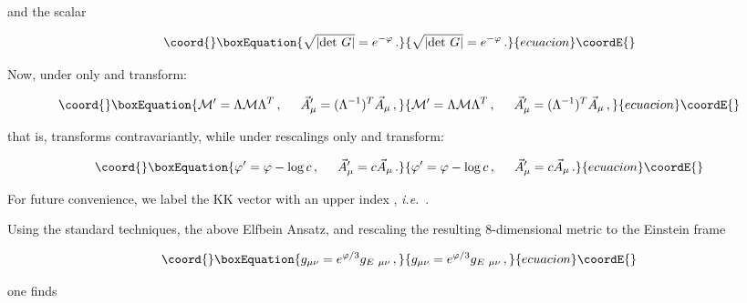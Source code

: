 \documentclass[12pt,a4paper]{article}
\begin{document}
\noindent and the scalar

\begin{equation}\coord{}\boxEquation{
\sqrt{|{\rm det}\ G|}=e^{-\varphi}\, .
}{
\sqrt{|{\rm det}\ G|}=e^{-\varphi}\, .
}{ecuacion}\coordE{}\end{equation}

\noindent Now, under \coordHE{} only \coordHE{} and \coordHE{}
transform:

\begin{equation}\coord{}\boxEquation{
{\cal M}^{\prime} = \Lambda {\cal M} \Lambda^{T}\, ,  
\hspace{.5cm}
\vec{A}_{\mu}^{\prime} = (\Lambda^{-1})^{T}\vec{A}_{\mu}\, ,
}{
{\cal M}^{\prime} = \Lambda {\cal M} \Lambda^{T}\, ,  
\hspace{.5cm}
\vec{A}_{\mu}^{\prime} = (\Lambda^{-1})^{T}\vec{A}_{\mu}\, ,
}{ecuacion}\coordE{}\end{equation}

\noindent that is, \coordHE{} transforms contravariantly,
while under \coordHE{} rescalings only \myHighlight{$\varphi$}\coordHE{} and
\coordHE{} transform:

\begin{equation}\coord{}\boxEquation{
\varphi^{\prime} = \varphi -\log{c}\, ,
\hspace{.5cm}
\vec{A}_{\mu}^{\prime} = c \vec{A}_{\mu}\, .
}{
\varphi^{\prime} = \varphi -\log{c}\, ,
\hspace{.5cm}
\vec{A}_{\mu}^{\prime} = c \vec{A}_{\mu}\, .
}{ecuacion}\coordE{}\end{equation}

\noindent For future convenience, we label the KK vector with an upper 
index \coordHE{}, {\em i.e.}~\coordHE{}.

Using the standard techniques, the above Elfbein Ansatz, and rescaling
the resulting 8-dimensional metric to the Einstein frame

\begin{equation}\coord{}\boxEquation{
\label{eq:masscale}
g_{\mu\nu} =e^{\varphi/3}g_{E\ \mu\nu}\, ,  
}{
g_{\mu\nu} =e^{\varphi/3}g_{E\ \mu\nu}\, ,  
}{ecuacion}\coordE{}\end{equation}

\noindent one finds
\end{document}
